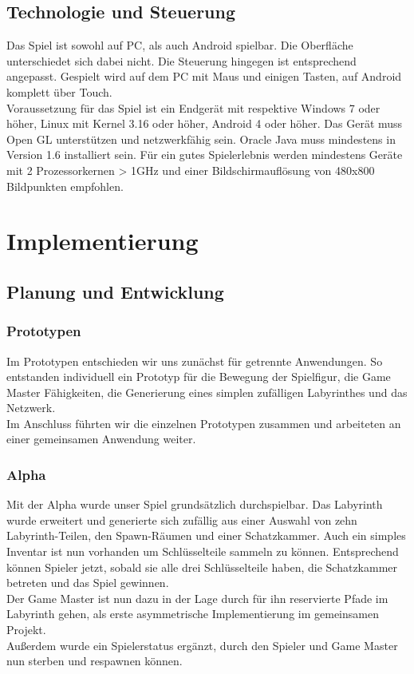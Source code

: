 \documentclass[10pt,a4paper,notitlepage]{scrreprt}
\begin{document}
		\section{Technologie und Steuerung}
		Das Spiel ist sowohl auf PC, als auch Android spielbar. Die Oberfläche unterschiedet sich dabei nicht. Die Steuerung hingegen ist entsprechend angepasst. Gespielt wird auf dem PC mit Maus und einigen Tasten, auf Android komplett über Touch.\\
		Voraussetzung für das Spiel ist ein Endgerät mit respektive Windows 7 oder höher, Linux mit Kernel 3.16 oder höher, Android 4 oder höher. Das Gerät muss Open GL unterstützen und netzwerkfähig sein. Oracle Java muss mindestens in Version 1.6 installiert sein. Für ein gutes Spielerlebnis werden mindestens Geräte mit 2 Prozessorkernen > 1GHz und einer Bildschirmauflösung von 480x800 Bildpunkten empfohlen.\\
	
	\chapter{Implementierung}
		\section{Planung und Entwicklung}
			\subsection{ Prototypen}
			Im Prototypen entschieden wir uns zunächst für getrennte Anwendungen. So entstanden individuell ein Prototyp für die Bewegung der Spielfigur, die Game Master Fähigkeiten, die Generierung eines simplen zufälligen Labyrinthes und das Netzwerk.\\
			Im Anschluss führten wir die einzelnen Prototypen zusammen und arbeiteten an einer gemeinsamen Anwendung weiter.\\
			
			\subsection{Alpha}
			
			Mit der Alpha wurde unser Spiel grundsätzlich durchspielbar. Das Labyrinth wurde erweitert und generierte sich zufällig aus einer Auswahl von zehn Labyrinth-Teilen, den Spawn-Räumen und einer Schatzkammer. Auch ein simples Inventar ist nun vorhanden um Schlüsselteile sammeln zu können. Entsprechend können Spieler jetzt, sobald sie alle drei Schlüsselteile haben, die Schatzkammer betreten und das Spiel gewinnen.\\
			Der Game Master ist nun dazu in der Lage durch für ihn reservierte Pfade im Labyrinth gehen, als erste asymmetrische Implementierung im gemeinsamen Projekt.\\
			Außerdem wurde ein Spielerstatus ergänzt, durch den Spieler und Game Master nun sterben und respawnen können.\\
			
\end{document}
